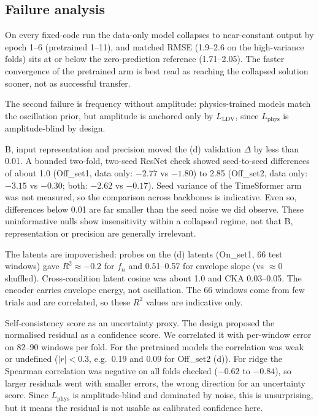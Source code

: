 \documentclass[conference]{IEEEtran}
\begin{document}
\subsection{Failure analysis}
On every fixed-code run the data-only model collapses to near-constant output by epoch 1--6 (pretrained 1--11), and matched RMSE (1.9--2.6 on the high-variance folds) sits at or below the zero-prediction reference (1.71--2.05). The faster convergence of the pretrained arm is best read as reaching the collapsed solution sooner, not as successful transfer.

The second failure is frequency without amplitude: physics-trained models match the oscillation prior, but amplitude is anchored only by $L_{\mathrm{LDV}}$, since $L_{\mathrm{phys}}$ is amplitude-blind by design.

B, input representation and precision moved the (d) validation $\Delta$ by less than 0.01. A bounded two-fold, two-seed ResNet check showed seed-to-seed differences of about 1.0 (Off\_set1, data only: $-2.77$ vs $-1.80$) to 2.85 (Off\_set2, data only: $-3.15$ vs $-0.30$; both: $-2.62$ vs $-0.17$). Seed variance of the TimeSformer arm was not measured, so the comparison across backbones is indicative. Even so, differences below 0.01 are far smaller than the seed noise we did observe. These uninformative nulls show insensitivity within a collapsed regime, not that B, representation or precision are generally irrelevant.

The latents are impoverished: probes on the (d) latents (On\_set1, 66 test windows) gave $R^2 \approx -0.2$ for $f_n$ and 0.51--0.57 for envelope slope (vs $\approx 0$ shuffled). Cross-condition latent cosine was about 1.0 and CKA 0.03--0.05. The encoder carries envelope energy, not oscillation. The 66 windows come from few trials and are correlated, so these $R^2$ values are indicative only.

Self-consistency score as an uncertainty proxy. The design proposed the normalised residual as a confidence score. We correlated it with per-window error on 82--90 windows per fold. For the pretrained models the correlation was weak or undefined ($|r| < 0.3$, e.g.\ 0.19 and 0.09 for Off\_set2 (d)). For ridge the Spearman correlation was negative on all folds checked ($-0.62$ to $-0.84$), so larger residuals went with smaller errors, the wrong direction for an uncertainty score. Since $L_{\mathrm{phys}}$ is amplitude-blind and dominated by noise, this is unsurprising, but it means the residual is not usable as calibrated confidence here.
\end{document}
